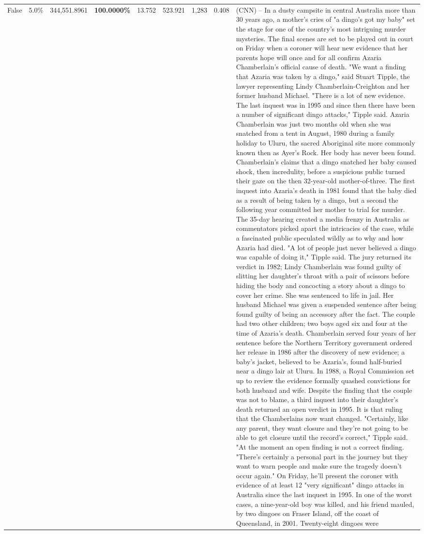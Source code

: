 \begin{table}[H]
\begin{tabular}{lllrlllll}
False & 5.0\% & 344,551.8961 & \bfseries \color{red} 100.0000\% & 13.752 & 523.921 & 1,283 & 0.408 & (CNN) -- In a dusty campsite in central Australia more than 30 years ago, a mother's cries of "a dingo's got my baby" set the stage for one of the country's most intriguing murder mysteries. The final scenes are set to be played out in court on Friday when a coroner will hear new evidence that her parents hope will once and for all confirm Azaria Chamberlain's official cause of death. "We want a finding that Azaria was taken by a dingo," said Stuart Tipple, the lawyer representing Lindy Chamberlain-Creighton and her former husband Michael. "There is a lot of new evidence. The last inquest was in 1995 and since then there have been a number of significant dingo attacks," Tipple said. Azaria Chamberlain was just two months old when she was snatched from a tent in August, 1980 during a family holiday to Uluru, the sacred Aboriginal site more commonly known then as Ayer's Rock. Her body has never been found. Chamberlain's claims that a dingo snatched her baby caused shock, then incredulity, before a suspicious public turned their gaze on the then 32-year-old mother-of-three. The first inquest into Azaria's death in 1981 found that the baby died as a result of being taken by a dingo, but a second the following year committed her mother to trial for murder. The 35-day hearing created a media frenzy in Australia as commentators picked apart the intricacies of the case, while a fascinated public speculated wildly as to why and how Azaria had died. "A lot of people just never believed a dingo was capable of doing it," Tipple said. The jury returned its verdict in 1982; Lindy Chamberlain was found guilty of slitting her daughter's throat with a pair of scissors before hiding the body and concocting a story about a dingo to cover her crime. She was sentenced to life in jail. Her husband Michael was given a suspended sentence after being found guilty of being an accessory after the fact. The couple had two other children; two boys aged six and four at the time of Azaria's death. Chamberlain served four years of her sentence before the Northern Territory government ordered her release in 1986 after the discovery of new evidence; a baby's jacket, believed to be Azaria's, found half-buried near a dingo lair at Uluru. In 1988, a Royal Commission set up to review the evidence formally quashed convictions for both husband and wife. Despite the finding that the couple was not to blame, a third inquest into their daughter's death returned an open verdict in 1995. It is that ruling that the Chamberlains now want changed. "Certainly, like any parent, they want closure and they're not going to be able to get closure until the record's correct," Tipple said. "At the moment an open finding is not a correct finding. "There's certainly a personal part in the journey but they want to warn people and make sure the tragedy doesn't occur again." On Friday, he'll present the coroner with evidence of at least 12 "very significant" dingo attacks in Australia since the last inquest in 1995. In one of the worst cases, a nine-year-old boy was killed, and his friend mauled, by two dingoes on Fraser Island, off the coast of Queensland, in 2001. Twenty-eight dingoes were 
\end{tabular}
\end{table}
